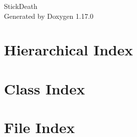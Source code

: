 \documentclass[twoside]{book}
\newcommand{\+}{\discretionary{\mbox{\scriptsize$\hookleftarrow$}}{}{}}
\newcommand{\clearemptydoublepage}{%
    \newpage{\pagestyle{empty}\cleardoublepage}%
  }
\begin{document}
  \raggedbottom
    \hypersetup{pageanchor=false,
                bookmarksnumbered=true,
                pdfencoding=unicode
               }
  \begin{titlepage}
  \vspace*{7cm}
  \begin{center}%
  {\Large Stick\+Death}\\
  \vspace*{1cm}
  {\large Generated by Doxygen 1.17.0}\\
  \end{center}
  \end{titlepage}
  \clearemptydoublepage
  \tableofcontents
  \clearemptydoublepage
  \hypersetup{pageanchor=true}
\chapter{Hierarchical Index}

\chapter{Class Index}

\chapter{File Index}

\end{document}
